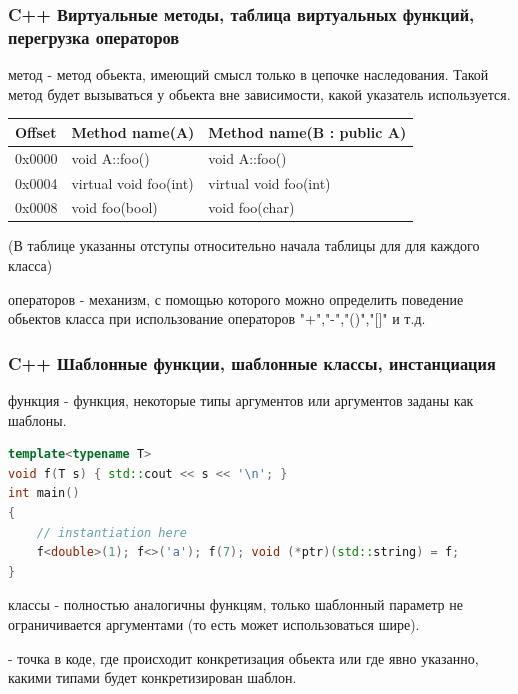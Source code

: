 \documentclass[10pt,fullscreen=true, bookmarks=false]{beamer}
\begin{document}
\begin{frame}[fragile]
\frametitle{C++ Виртуальные методы, таблица виртуальных функций, перегрузка операторов}

{ метод} - метод обьекта, имеющий смысл только в цепочке наследования. Такой метод будет вызываться у обьекта вне зависимости, какой указатель используется.
\newline 

\begin{tabular}{|l|l|l|}
\hline
Offset	& Method name(A) & Method name(B : public A)\\
\hline
0x0000	& void A::foo() & void A::foo()\\
\hline
0x0004 	& virtual void foo(int) & virtual void foo(int) \\
\hline
0x0008 	& void foo(bool) &  void foo(char)\\
\hline
\end{tabular}

(В таблице указанны отступы относительно начала таблицы для для каждого класса)

{ операторов} - механизм, с помощью которого можно определить поведение обьектов класса при использование операторов "+","-","()","[]" и т.д. 

\tableofcontents[pausesections]
\end{frame}


\begin{frame}[fragile]
\frametitle{C++ Шаблонные функции, шаблонные классы, инстанциация}

{ функция} - функция, некоторые типы аргументов или аргументов заданы как шаблоны.

\begin{lstlisting}[language=C++,breaklines]
template<typename T>
void f(T s) { std::cout << s << '\n'; }
int main()
{
	// instantiation here 
    f<double>(1); f<>('a'); f(7); void (*ptr)(std::string) = f;
}
\end{lstlisting}


{ классы} - полностью аналогичны функцям, только шаблонный параметр не ограничивается аргументами (то есть может использоваться шире).

{} - точка в коде, где происходит конкретизация обьекта или где явно указанно, какими типами будет конкретизирован шаблон.

\tableofcontents[pausesections]
\end{frame}
\end{document}
